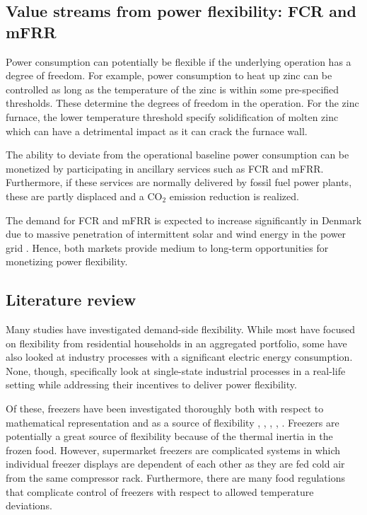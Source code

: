 \documentclass[lettersize,journal]{IEEEtran}
\begin{document}

\subsection{Value streams from power flexibility: FCR and mFRR}

Power consumption can potentially be flexible if the underlying operation has a  degree of freedom. For example, power consumption to heat up zinc can be controlled as long as the temperature of the zinc is within some pre-specified thresholds. These determine the degrees of freedom in the operation. For the zinc furnace, the lower temperature threshold specify solidification of molten zinc which can have a detrimental impact as it can crack the furnace wall.

The ability to deviate from the operational baseline power consumption can be monetized by participating in ancillary services such as FCR and mFRR. Furthermore, if these services are normally delivered by fossil fuel power plants, these are partly displaced and a CO$_{2}$ emission reduction is realized.

The demand for FCR and mFRR is expected to increase significantly in Denmark due to massive penetration of intermittent solar and wind energy in the power grid \cite{energinet:scenario_report_2022}. Hence, both markets provide medium to long-term opportunities for monetizing power flexibility.


\subsection{Literature review}

Many studies have investigated demand-side flexibility. While most have focused on flexibility from residential households in an aggregated portfolio, some have also looked at industry processes with a significant electric energy consumption. None, though, specifically look at single-state industrial processes in a real-life setting while addressing their incentives to deliver power flexibility.

Of these, freezers have been investigated thoroughly both with respect to mathematical representation \cite{pedersen2016improving}  and as a source of flexibility \cite{sossan2016grey}, \cite{o2013modelling}, \cite{de2019leveraging}, \cite{misaghian2022fast}, \cite{vrettos2016fast}. Freezers are potentially a great source of flexibility because of the thermal inertia in the frozen food. However, supermarket freezers are complicated systems in which individual freezer displays are dependent of each other as they are fed cold air from the same compressor rack. Furthermore, there are many food regulations that complicate control of freezers with respect to allowed temperature deviations.
\end{document}
